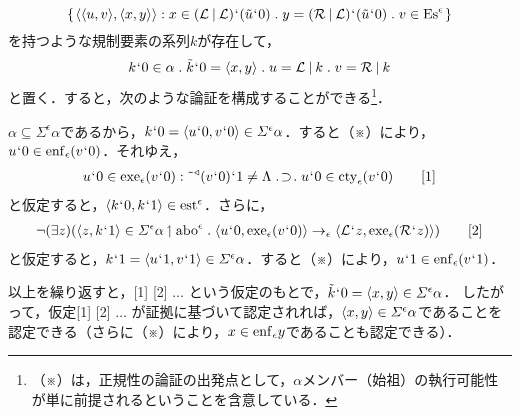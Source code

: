 \[
    \classab{\orp{\orp{u,v},\orp{x,y}}:
    x\in (\mathcal{L}\resl\mathcal{L})\fap(\tilde{u}\fap 0)\con{1}y = (\mathcal{R}\resl\mathcal{L})\fap(\tilde{u}\fap 0)\con{1}v\in\mathrm{Es}^\epsilon
    }
\]
を持つような規制要素の系列$ k $が存在して，
\[
    k\fap 0 \in\alpha\con{1}\tilde{k}\fap 0 = \orp{x,y}\con{1}u = \mathcal{L}\resl k\con{1}v = \mathcal{R}\resl k
\]
と置く．すると，次のような論証を構成することができる\footnote{
    （※）は，正規性の論証の出発点として，$ \alpha $メンバー（始祖）の執行可能性が単に前提されるということを含意している．
}．
\begin{nom}
    \setcounter{equation}{0}
$ \alpha\subseteq\varSigma^{\epsilon}\alpha $であるから，$ k{\mspace{1mu}{`}\mspace{1mu}} 0 =\langle u{\mspace{1mu}{`}\mspace{1mu}} 0,v{\mspace{1mu}{`}\mspace{1mu}} 0 \rangle\in\varSigma^{\epsilon}\alpha $．すると（※）により，
    $ u{\mspace{1mu}{`}\mspace{1mu}} 0\in\mathrm{enf}_{\epsilon}(v{\mspace{1mu}{`}\mspace{1mu}} 0) $．それゆえ，
    \begin{align}
        u\fap 0\in\exe{\epsilon}{(v\fap 0)}\con{2}
        \tildel{\trgl{(v\fap 0)}}\fap 1\neq\Lambda\case{1}{1}{1}
        u\fap 0\in\cty{\epsilon}(v\fap 0)
        \tag*{[1]}
    \end{align}
    と仮定すると，$ \langle k{\mspace{1mu}{`}\mspace{1mu}} 0,k{\mspace{1mu}{`}\mspace{1mu}} 1 \rangle\in\mathrm{est}^\epsilon $．さらに，
    \begin{align}
        \neg(\exists z)(\orp{z,k\fap 1}\in \varSigma^{\epsilon}\alpha\uphl\mathrm{abo}^\epsilon\con{1}
        \orp{u\fap 0,\exe{\epsilon}{(v\fap 0)}}\to_{\epsilon}\orp{\mathcal{L}\fap z,\exe{\epsilon}{(\mathcal{R}\fap z)}}
        )
        \tag*{[2]}
    \end{align}
    と仮定すると，$ k{\mspace{1mu}{`}\mspace{1mu}} 1 = \langle u{\mspace{1mu}{`}\mspace{1mu}} 1,v{\mspace{1mu}{`}\mspace{1mu}} 1 \rangle\in \varSigma^{\epsilon}\alpha $．すると（※）により，$ u{\mspace{1mu}{`}\mspace{1mu}} 1\in\mathrm{enf}_{\epsilon}(v{\mspace{1mu}{`}\mspace{1mu}} 1) $．
    
    以上を繰り返すと，[1] [2] $\dots$ という仮定のもとで，$ \tilde{k}{\mspace{1mu}{`}\mspace{1mu}} 0 = \langle x,y \rangle\in \varSigma^{\epsilon}\alpha $．
    したがって，仮定[1] [2] $\dots$ が証拠に基づいて認定されれば，$ \langle x,y \rangle\in \varSigma^{\epsilon}\alpha $であることを認定できる（さらに（※）により，$ x\in\mathrm{enf}_{\epsilon}y $であることも認定できる）．
\end{nom}

